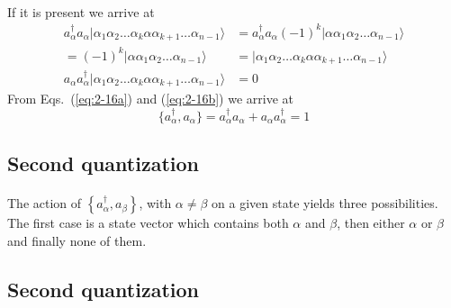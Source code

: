 \documentclass[%
twoside,                 %
final,                   %
10pt]{article}
\begin{document}
\paragraph{}
 If it is present
we arrive at
\begin{align}
	a_\alpha^{\dagger} a_\alpha |\alpha_1\alpha_2 \dots \alpha_{k}\alpha \alpha_{k+1} \dots \alpha_{n-1}\rangle &=
	a_\alpha^{\dagger} a_\alpha (-1)^k |\alpha \alpha_1\alpha_2 \dots \alpha_{n-1}\rangle \nonumber \\
	= (-1)^k |\alpha \alpha_1\alpha_2 \dots \alpha_{n-1}\rangle &=
	|\alpha_1\alpha_2 \dots \alpha_{k}\alpha \alpha_{k+1} \dots \alpha_{n-1}\rangle \nonumber \\
	a_\alpha a_\alpha^{\dagger}|\alpha_1\alpha_2 \dots \alpha_{k}\alpha \alpha_{k+1} \dots \alpha_{n-1}\rangle &= 0 \label{eq:2-16b}
\end{align}
From Eqs.~(\ref{eq:2-16a}) and  (\ref{eq:2-16b}) we arrive at 
\begin{equation}
	\{a_\alpha^{\dagger} , a_\alpha \} = a_\alpha^{\dagger} a_\alpha + a_\alpha a_\alpha^{\dagger} = 1 \label{eq:2-17}
\end{equation}




\subsection*{Second quantization}

\paragraph{}
The action of $\left\{a_\alpha^{\dagger}, a_\beta\right\}$, with 
$\alpha \ne \beta$ on a given state yields three possibilities. 
The first case is a state vector which contains both $\alpha$ and $\beta$, then either 
$\alpha$ or $\beta$ and finally none of them.




\subsection*{Second quantization}

\end{document}
